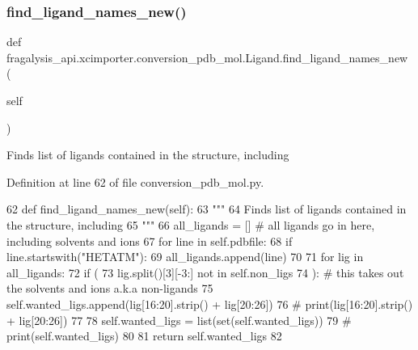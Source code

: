 \subsubsection{\texorpdfstring{find\+\_\+ligand\+\_\+names\+\_\+new()}{find\_ligand\_names\_new()}}
{\footnotesize\ttfamily def fragalysis\+\_\+api.\+xcimporter.\+conversion\+\_\+pdb\+\_\+mol.\+Ligand.\+find\+\_\+ligand\+\_\+names\+\_\+new (\begin{DoxyParamCaption}\item[{}]{self }\end{DoxyParamCaption})}

\begin{DoxyVerb}Finds list of ligands contained in the structure, including
\end{DoxyVerb}
 

Definition at line 62 of file conversion\+\_\+pdb\+\_\+mol.\+py.


\begin{DoxyCode}
62     \textcolor{keyword}{def }find\_ligand\_names\_new(self):
63         \textcolor{stringliteral}{"""}
64 \textcolor{stringliteral}{        Finds list of ligands contained in the structure, including}
65 \textcolor{stringliteral}{        """}
66         all\_ligands = []  \textcolor{comment}{# all ligands go in here, including solvents and ions}
67         \textcolor{keywordflow}{for} line \textcolor{keywordflow}{in} self.pdbfile:
68             \textcolor{keywordflow}{if} line.startswith(\textcolor{stringliteral}{"HETATM"}):
69                 all\_ligands.append(line)
70 
71         \textcolor{keywordflow}{for} lig \textcolor{keywordflow}{in} all\_ligands:
72             \textcolor{keywordflow}{if} (
73                 lig.split()[3][-3:] \textcolor{keywordflow}{not} \textcolor{keywordflow}{in} self.non\_ligs
74             ):  \textcolor{comment}{# this takes out the solvents and ions a.k.a non-ligands}
75                 self.wanted\_ligs.append(lig[16:20].strip() + lig[20:26])
76                 \textcolor{comment}{# print(lig[16:20].strip() + lig[20:26])}
77 
78         self.wanted\_ligs = list(set(self.wanted\_ligs))
79         \textcolor{comment}{# print(self.wanted\_ligs)}
80 
81         \textcolor{keywordflow}{return} self.wanted\_ligs
82 
\end{DoxyCode}
\mbox{\label{classfragalysis__api_1_1xcimporter_1_1conversion__pdb__mol_1_1_ligand_af0d3d0b75f9f10f0f50cba06017c4ba6}} 
